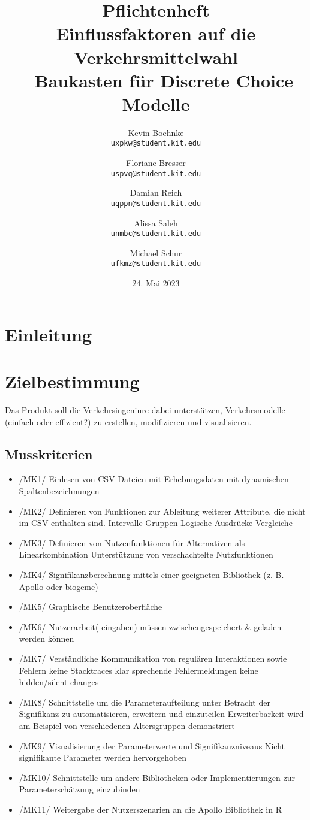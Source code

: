 \documentclass{article}
\title{Pflichtenheft \\ \large Einflussfaktoren auf die Verkehrsmittelwahl\\ -- Baukasten für Discrete Choice Modelle}
\author{Kevin Boehnke \\ \texttt{uxpkw@student.kit.edu}
\and Floriane Bresser \\ \texttt{uspvq@student.kit.edu}
\and Damian Reich \\ \texttt{uqppn@student.kit.edu}
\and Alissa Saleh \\ \texttt{unmbc@student.kit.edu}
\and Michael Schur \\ \texttt{ufkmz@student.kit.edu}}
\date{24. Mai 2023}
\begin{document}
\clearpage\maketitle\thispagestyle{empty}
\newpage
\clearpage\tableofcontents\thispagestyle{empty}
\newpage
{}

\section{Einleitung}

\section{Zielbestimmung}
Das Produkt soll die Verkehrsingeniure dabei unterstützen, Verkehrsmodelle (einfach oder effizient?) zu erstellen, modifizieren und visualisieren.
\subsection{Musskriterien}
\begin{itemize}
    \item /MK1/ Einlesen von CSV-Dateien mit Erhebungsdaten mit dynamischen Spaltenbezeichnungen
    \item /MK2/ Definieren von Funktionen zur Ableitung weiterer Attribute, die nicht im CSV enthalten sind.
        \subitem Intervalle
        \subitem Gruppen
        \subitem Logische Ausdrücke
        \subitem Vergleiche
    \item /MK3/ Definieren von Nutzenfunktionen für Alternativen als Linearkombination
        \subitem Unterstützung von verschachtelte Nutzfunktionen
    \item /MK4/ Signifikanzberechnung mittels einer geeigneten Bibliothek (z. B. Apollo oder biogeme)
    \item /MK5/ Graphische Benutzeroberfläche
    \item /MK6/ Nutzerarbeit(-eingaben) müssen zwischengespeichert \& geladen werden können
    \item /MK7/ Verständliche Kommunikation von regulären Interaktionen sowie Fehlern
        \subitem keine Stacktraces
        \subitem klar sprechende Fehlermeldungen
        \subitem keine hidden/silent changes
    \item /MK8/ Schnittstelle um die Parameteraufteilung unter Betracht der Signifikanz  zu automatisieren, erweitern und einzuteilen
        \subitem Erweiterbarkeit wird am Beispiel von verschiedenen Altersgruppen demonstriert
    \item /MK9/ Visualisierung der Parameterwerte und Signifikanzniveaus
        \subitem Nicht signifikante Parameter werden hervorgehoben
    \item /MK10/ Schnittstelle um andere Bibliotheken oder Implementierungen zur Parameterschätzung einzubinden
    \item /MK11/ Weitergabe der Nutzerszenarien an die Apollo Bibliothek in R
\end{itemize}
\end{document}

